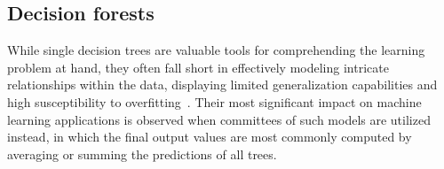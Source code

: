 %
%
%
%


\subsection{Decision forests}

While single decision trees are valuable tools for comprehending the learning problem at hand, they often fall short in effectively modeling intricate relationships within the data, displaying limited generalization capabilities and high susceptibility to overfitting~\cite{}.
%
Their most significant impact on machine learning applications is observed when committees of such models are utilized instead, in which the final output values are most commonly computed by averaging or summing the predictions of all trees.

